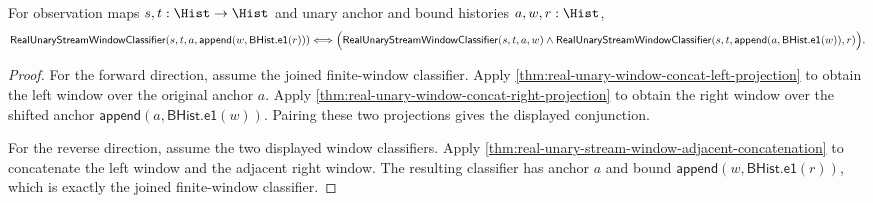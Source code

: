 \begin{theorem}
\label{thm:real-unary-window-adjacent-concat-iff}
For observation maps $s,t:\Hist\to\Hist$ and unary anchor and bound histories
$a,w,r:\Hist$,
$$
\mathsf{RealUnaryStreamWindowClassifier}
(s,t,a,\mathsf{append}(w,\mathsf{BHist.e1}(r)))
\Longleftrightarrow
\Bigl(
\mathsf{RealUnaryStreamWindowClassifier}(s,t,a,w)
\land
\mathsf{RealUnaryStreamWindowClassifier}
(s,t,\mathsf{append}(a,\mathsf{BHist.e1}(w)),r)
\Bigr).
$$
\end{theorem}
\begin{proof}
For the forward direction, assume the joined finite-window classifier. Apply
\autoref{thm:real-unary-window-concat-left-projection} to obtain the left
window over the original anchor $a$. Apply
\autoref{thm:real-unary-window-concat-right-projection} to obtain the right
window over the shifted anchor $\mathsf{append}(a,\mathsf{BHist.e1}(w))$.
Pairing these two projections gives the displayed conjunction.

For the reverse direction, assume the two displayed window classifiers. Apply
\autoref{thm:real-unary-stream-window-adjacent-concatenation} to concatenate
the left window and the adjacent right window. The resulting classifier has
anchor $a$ and bound $\mathsf{append}(w,\mathsf{BHist.e1}(r))$, which is
exactly the joined finite-window classifier.
\end{proof}

